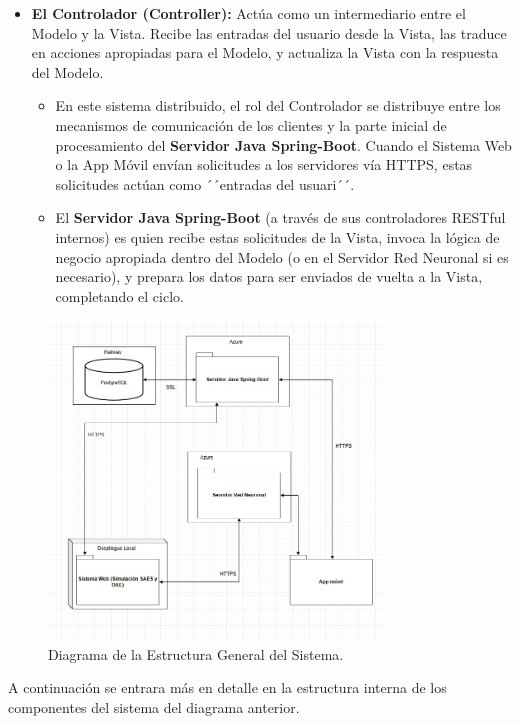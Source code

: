 \begin{itemize}
	\item \textbf{El Controlador (Controller):} Actúa como un intermediario entre el Modelo y la Vista. Recibe las entradas del usuario desde la Vista, las traduce en acciones apropiadas para el Modelo, y actualiza la Vista con la respuesta del Modelo.
	\begin{itemize}
		\item En este sistema distribuido, el rol del Controlador se distribuye entre los mecanismos de comunicación de los clientes y la parte inicial de procesamiento del \textbf{Servidor Java Spring-Boot}. Cuando el Sistema Web o la App Móvil envían solicitudes a los servidores vía HTTPS, estas solicitudes actúan como ´´entradas del usuari´´.
		\item El \textbf{Servidor Java Spring-Boot} (a través de sus controladores RESTful internos) es quien recibe estas solicitudes de la Vista, invoca la lógica de negocio apropiada dentro del Modelo (o en el Servidor Red Neuronal si es necesario), y prepara los datos para ser enviados de vuelta a la Vista, completando el ciclo.
	\end{itemize}
\end{itemize}


\begin{figure}[htbp!]
	\begin{center}
		\includegraphics[width=0.8\textwidth]{images/DiagramaGeneralClases}
		\caption{Diagrama de la Estructura General del Sistema.}
		\label{fig:Diagrama de sistemas}
	\end{center}
\end{figure}

A continuación se entrara más en detalle en la estructura interna de los componentes del sistema del diagrama anterior.

\newpage